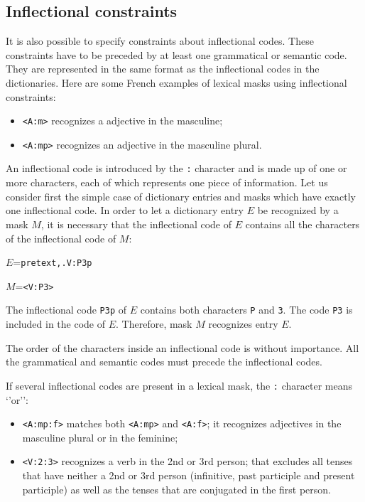 \subsection{Inflectional constraints}
It is also possible to specify constraints about inflectional codes. These
constraints have to be preceded by at least one grammatical or semantic code.
They are represented in the same format as the inflectional codes in the dictionaries.
Here are some French examples of lexical masks using inflectional
constraints:

\begin{itemize}
  \item \verb+<A:m>+ recognizes a adjective in the masculine;
  \item \verb+<A:mp>+ recognizes an adjective in the masculine plural.
\end{itemize}

\noindent An inflectional code is introduced by the \verb+:+ character and
is made up of one or more characters, each of which represents one piece of
information. Let us consider first the simple case of dictionary entries and masks
which have exactly one inflectional code.
In order to let a dictionary entry $E$ be recognized by a mask $M$, it
is necessary that the inflectional code of $E$ contains all the characters
of the inflectional code of $M$:

\bigskip
$E$=\verb$pretext,.V:P3p$

$M$=\verb$<V:P3>$

\bigskip
\noindent The inflectional code \verb+P3p+ of $E$
contains both characters \verb+P+ and \verb+3+. The code \verb+P3+ is
included in the code of $E$. Therefore, mask $M$ recognizes entry $E$.

\bigskip
\noindent The order of the
characters inside an inflectional code is without importance. All the grammatical
and semantic codes must precede the inflectional codes.
 
 \bigskip
 \noindent If several inflectional codes are present in a lexical mask, the \verb+:+
 character means `'or'':
 
\begin{itemize}
  \item \verb+<A:mp:f>+ matches both \verb+<A:mp>+ and \verb+<A:f>+; it
  recognizes adjectives in the masculine plural or in the feminine;
  \item \verb+<V:2:3>+ recognizes a verb in the 2nd or 3rd person; that excludes
  all tenses that have neither a 2nd or 3rd person (infinitive, past participle
  and present participle) as well as the tenses that are conjugated in the first
  person.
\end{itemize}

